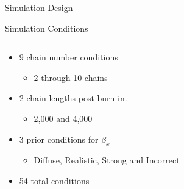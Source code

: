 \documentclass[final,hyperref={pdfpagelabels=false}]{beamer}
\begin{document}
\begin{frame}[t]
\begin{columns}[t]
\begin{column}{.465\textwidth}
\begin{block}{Simulation Design}
\end{block}


\begin{block}{Simulation Conditions}
\begin{columns} %
	\begin{column}{.50\textwidth} %
\begin{itemize}
	\item 9 chain number conditions 
	\begin{itemize}
		\item 2 through 10 chains
	\end{itemize}
	\item 2 chain lengths post burn in.
	\begin{itemize}
		\item 2,000 and 4,000
	\end{itemize}
	\item 3 prior conditions for $\beta_{x}$
	\begin{itemize}
		\item Diffuse, Realistic, Strong and Incorrect
	\end{itemize}
	\item 54 total conditions
\end{itemize}						
	\end{column}
	

\end{columns}
\end{block}
\end{column}
\end{columns}
\end{frame}
\end{document}
